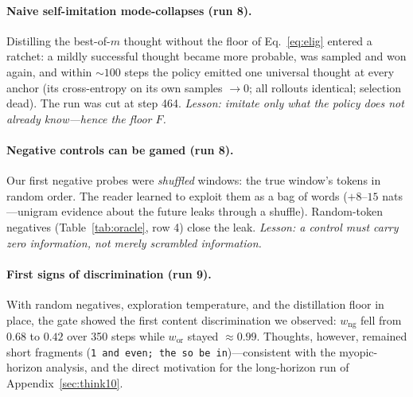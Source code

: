 \documentclass{article} %
\begin{document}
\paragraph{Naive self-imitation mode-collapses (run 8).} Distilling the best-of-$m$ thought without the floor of Eq.~\eqref{eq:elig} entered a ratchet: a mildly successful thought became more probable, was sampled and won again, and within ${\sim}100$ steps the policy emitted one universal thought at every anchor (its cross-entropy on its own samples $\to 0$; all rollouts identical; selection dead). The run was cut at step 464. \emph{Lesson: imitate only what the policy does not already know---hence the floor $F$.}

\paragraph{Negative controls can be gamed (run 8).} Our first negative probes were \emph{shuffled} windows: the true window's tokens in random order. The reader learned to exploit them as a bag of words ($+8$--$15$ nats---unigram evidence about the future leaks through a shuffle). Random-token negatives (Table~\ref{tab:oracle}, row 4) close the leak. \emph{Lesson: a control must carry zero information, not merely scrambled information.}

\paragraph{First signs of discrimination (run 9).} With random negatives, exploration temperature, and the distillation floor in place, the gate showed the first content discrimination we observed: $w_{\mathrm{ng}}$ fell from $0.68$ to $0.42$ over 350 steps while $w_{\mathrm{or}}$ stayed ${\approx}0.99$. Thoughts, however, remained short fragments (\texttt{1 and even; the so be in})---consistent with the myopic-horizon analysis, and the direct motivation for the long-horizon run of Appendix~\ref{sec:think10}.
\end{document}
